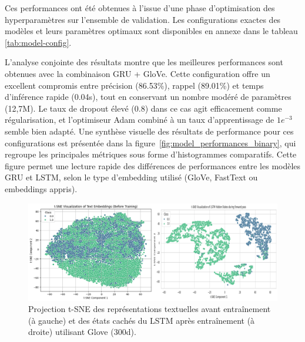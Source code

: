 \documentclass[12pt]{report}
\begin{document}
\begin{table}[H]
\centering
\renewcommand{\arraystretch}{1.2}
\caption{Performances des modèles RNN avec word embeddings pré-entraînés sur l'ensemble de test.}
\label{tab:pretrained_embeddings}
\end{table}

Ces performances ont été obtenues à l’issue d’une phase d’optimisation des hyperparamètres sur l’ensemble de validation. Les configurations exactes des modèles et leurs paramètres optimaux sont disponibles en annexe dans le tableau \autoref{tab:model-config}.

L’analyse conjointe des résultats montre que les meilleures performances sont obtenues avec la combinaison GRU + GloVe. Cette configuration offre un excellent compromis entre précision (86.53\%), rappel (89.01\%) et temps d'inférence rapide (0.04s), tout en conservant un nombre modéré de paramètres (12,7M). Le taux de dropout élevé (0.8) dans ce cas agit efficacement comme régularisation, et l’optimiseur Adam combiné à un taux d’apprentissage de $1e^{-3}$ semble bien adapté. Une synthèse visuelle des résultats de performance pour ces configurations est présentée dans la figure~\ref{fig:model_performances_binary}, qui regroupe les principales métriques sous forme d’histogrammes comparatifs. Cette figure permet une lecture rapide des différences de performances entre les modèles GRU et LSTM, selon le type d’embedding utilisé (GloVe, FastText ou embeddings appris).

\begin{figure}[H]
\centering
\includegraphics[width=0.7\linewidth]{Merged_Images.png}
\caption{Projection t-SNE des représentations textuelles avant entraînement (à gauche) et des états cachés du LSTM après entraînement (à droite) utilisant Glove (300d).}
\label{fig:tsne_lstm_glove}
\end{figure}
\end{document}

